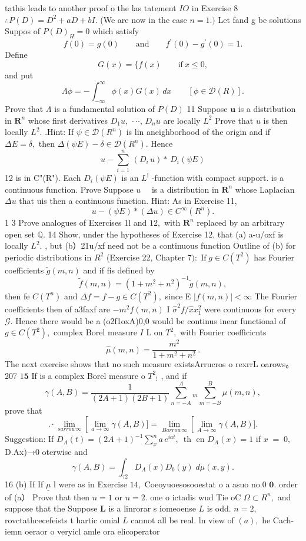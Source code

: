 tathis leads to another proof o the las tatement $I O$ in Exercise 8 $\therefore P(D)=D^{2}+a D+b I.$ (We are now in the case $n=1.)$ Let fand g be solutions Suppos of $P(D)_{H}=0$ which satisfy $$ f(0)=g(0)\qquad\mathrm{and}\qquad f^{\prime}(0)-g^{\prime}(0)=1. $$ Define $$ G(x)= \{f(x)\qquad{\mathrm{if~}}x\leq0, $$ and put $$ \Lambda\phi=-\int_{-\infty}^{\infty}\phi(x)G(x)\,d x\qquad[\phi\in{\mathcal D}(R)]. $$ Prove that $\Lambda$ is a fundamental solution of $\scriptstyle{P(D)}$ 11 Suppose ${\boldsymbol{u}}$ is a distribution in ${\boldsymbol{R}}^{n}$ whose first derivatives $D_{1}u,\,\cdot\cdot\cdot,\,D_{n}u$ are locally $L^{2}$ Prove that $\textstyle u$ is then locally $L^{2}.$ .Hint: If $\textstyle\psi\in{\mathcal{D}}(R^{n})$ is lin aneighborhood of the origin and if $\Delta{}E=\delta,$ then $\Delta(\psi E)-\delta\in{\mathcal{D}}(R^{n}).$ Hence $$ u-\sum_{i=1}^{n}\,(D_{i}\,u)*\,D_{i}(\psi E) $$ 12 is in C"(R"). Each $D_{i}(\psi E)$ is an $L^{\mathrm{i}}$ -function with compact support. is a continuous function. Prove Suppose $u\quad$ is a distribution in ${\boldsymbol{R}}^{n}$ whose Laplacian $\Delta u$ that uis then a continuous function. Hint: As in Exercise 11, $$ u-(\psi E)*(\Delta u)\in C^{\infty}(R^{n}). $$ 1 3 Prove analogues of Exercises 1l and $12,$ with ${\boldsymbol{R}}^{n}$ replaced by an arbitrary open set $\mathbb{Q}.$ 14 Show, under the hypotheses of Exercise 12, that (a) a-u/oxf is locally $L^{2}.$ , but (b）21u/xf need not be a continuous function Outline of (b) for periodic distributions in $R^{2}$ (Exercise 22, Chapter $7)\colon\operatorname{If}g\in C(T^{2})$ has Fourier coefficients ${\tilde{g}}(m,n)$ and if fis defined by $$ \tilde{f}(m,n)=(1+m^{2}+n^{2})^{-1}\tilde{g}(m,n), $$ then fe $C(T^{n})$ and $\Delta f=f-g\in C(T^{2}),$ since E $|f(m,n)|<\infty$ The Fourier coefficients then of a3faxf are $-m^{2}f(m,n)$ I $\scriptstyle{\hat{\sigma}}^{2}f/{\hat{x}}x_{1}^{2}$ were continuous for every ${\mathcal{G}}.$ Hence there would be a (o2f1oxA)0,0 would be continus inear functional of $g\in C(T^{2}),$ complex Borel measure $\boldsymbol{\mathit{I}}$ L on $T^{2},$ with Fourier coefficicnts $$ \hat{\mu}(m,n)=\frac{m^{2}}{1+m^{2}+n^{2}}\,. $$ The next exercise shows that no such measure existsArrucros o rexrrL oarows。 207 ${\boldsymbol{\mathit{1}}}{\boldsymbol{5}}$ If is a complex Borel measure o $T^{2}{}_{!}$ , and if $$ \gamma(A,B)=\frac{1}{(2A+1)(2B+1)}\sum_{n=-A}^{A}{}_{m}\sum_{m=-B}^{B}\hat{\mu}(m,n), $$ prove that $$ .\cdot\operatorname*{lim}_{s arrow\infty}\left[\operatorname*{lim}_{a\rightarrow\infty}\gamma(A,B) ]=\operatorname*{lim}_{B arrow\infty}\left[\operatorname*{lim}_{A\rightarrow\infty}\gamma(A,B) ]. $$ Suggestion: If $D_{A}(t)=(2A+1)^{-1}\sum_{x}^{n}a\,e^{i a t},\ \operatorname{th}$ en $D_{A}(x)=1$ if $\scriptstyle x\;=\;0,$ D.Ax)→0 oterwise and $$ \gamma(A,B)=\int_{\tau2}D_{A}(x)D_{b}(y)\;d\mu(x,y). $$ 16 (b) If If $\underline{{\mu}}$ l were as in Exercise $14,$ Coeoyuoesosooestat o a asuo no.0 ${\boldsymbol{0}}.$ order of (a） Prove that then $n=1$ or $n=2.$ one o ictadis wud Tie oC $\Omega\subset R^{n},$ and suppose that the Suppose ${\boldsymbol{L}}$ is a linrorar s iomeoense $\boldsymbol{\mathit{L}}$ is odd. $n=2,$ rovctathcecefeists t hartic omial $\boldsymbol{\mathit{L}}$ cannot all be real. ln view of $(a),$ he Cach-iemn oeraor o veryicl amle ora elicoperator